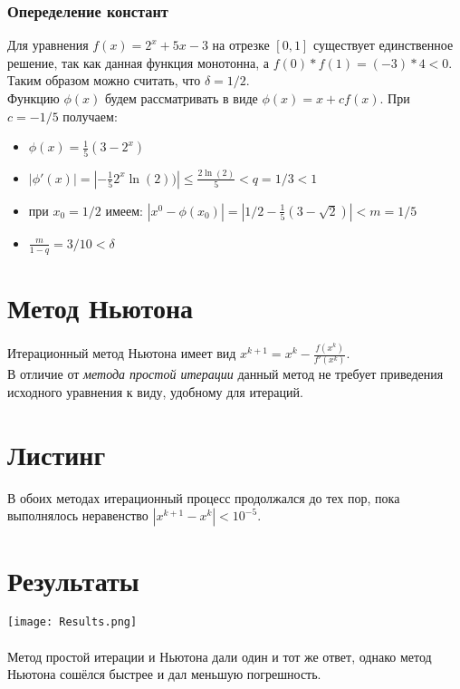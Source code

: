 \documentclass[12pt,a4paper]{article}
\begin{document}
	\subsubsection*{Опеределение констант}
	Для уравнения $f(x) = 2^x + 5x - 3$ на отрезке $[0, 1]$ существует единственное решение, так как данная функция монотонна, а $f(0)*f(1) = (-3)*4 < 0$. Таким образом можно считать, что $\delta = 1/2$. \\
	Функцию $\phi(x)$ будем рассматривать в виде $\phi(x) = x + cf(x)$. При $c = -1/5$ получаем:
	\begin{itemize}
		\item $\phi(x) = \frac{1}{5}(3 - 2^x)$
		\item $|\phi'(x)| = |-\frac{1}{5}2^x\ln(2))| \le \frac{2\ln(2)}{5} < q = 1/3 < 1$
		\item при $x_0 = 1/2$ имеем: $|x^0 - \phi(x_0)| = |1/2 - \frac{1}{5}(3 - \sqrt{2})| < m = 1/5$
		\item $\frac{m}{1 - q} = 3/10 < \delta$
	\end{itemize}
	\section{Метод Ньютона}
	Итерационный метод Ньютона имеет вид $x^{k+1} = x^k - \frac{f(x^{k})}{f'(x^k)}$. \\ 
	В отличие от \textit{метода простой итерации} данный метод не требует приведения исходного уравнения к виду, удобному для итераций.
	\section{Листинг}
	В обоих методах итерационный процесс продолжался до тех пор, пока выполнялось неравенство $|x^{k+1} - x^k| < 10^{-5}$.
	
	\section{Результаты}
	\texttt{[image: Results.png]} \\ \\
	Метод простой итерации и Ньютона дали один и тот же ответ, однако метод Ньютона сошёлся быстрее и дал меньшую погрешность.
\end{document}
